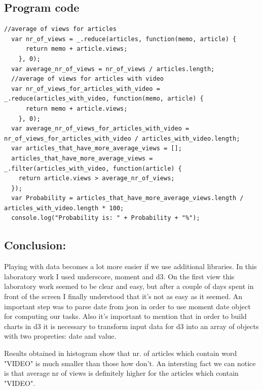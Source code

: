 \documentclass[12pt,a4paper]{article}
\begin{document}
\subsection*{Program code}
\begin{lstlisting}
//average of views for articles
  var nr_of_views = _.reduce(articles, function(memo, article) {
      return memo + article.views;
    }, 0);
  var average_nr_of_views = nr_of_views / articles.length;
  //average of views for articles with video
  var nr_of_views_for_articles_with_video = _.reduce(articles_with_video, function(memo, article) {
      return memo + article.views;
    }, 0);
  var average_nr_of_views_for_articles_with_video = nr_of_views_for_articles_with_video / articles_with_video.length;
  var articles_that_have_more_average_views = [];
  articles_that_have_more_average_views = _.filter(articles_with_video, function(article) {
    return article.views > average_nr_of_views;
  });
  var Probability = articles_that_have_more_average_views.length / articles_with_video.length * 100;
  console.log("Probability is: " + Probability + "%");

\end{lstlisting}

\subsection*{Conclusion:}

Playing with data becomes a lot more easier if we use additional libraries. In this laboratory work I used underscore, moment and
d3. On the first view this laboratory work seemed to be clear and easy, but after a couple of days spent in front of the screen I finally understood that it's not as easy as it seemed. An important step was to parse date from json in order to use moment date object for computing our tasks. Also it's important to mention that in order to build charts in d3 it is necessary to transform input data for d3 into an array of objects with two propreties: date and value.\\
  \par Results obtained in histogram show that nr. of articles which contain word "VIDEO" is much smaller than those how don't. An intersting fact we can notice is that average nr of views is definitely higher for the articles which contain "VIDEO".
\end{document}
